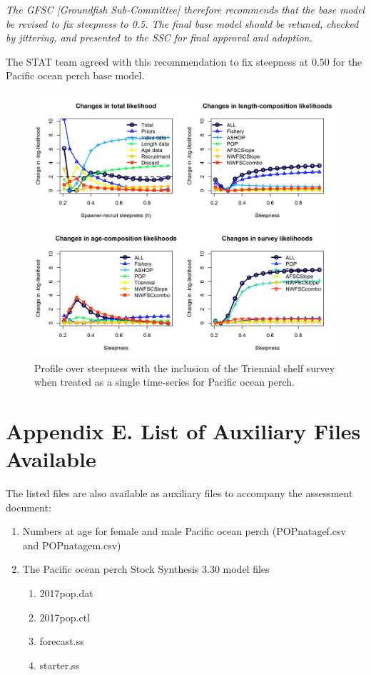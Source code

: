 \documentclass[12pt,]{article}
\begin{document}
\emph{The GFSC {[}Groundfish Sub-Committee{]} therefore recommends that
the base model be revised to fix steepness to 0.5. The final base model
should be retuned, checked by jittering, and presented to the SSC for
final approval and adoption.}

The STAT team agreed with this recommendation to fix steepness at 0.50
for the Pacific ocean perch base model.

\begin{figure}
\centering
\includegraphics{Figures/triennial_piner_panel_h.png}
\caption{Profile over steepness with the inclusion of the Triennial
shelf survey when treated as a single time-series for Pacific ocean
perch. \label{fig:Tri_Profile}}
\end{figure}

\FloatBarrier

\section{Appendix E. List of Auxiliary Files
Available}\label{appendix-e.-list-of-auxiliary-files-available}

The listed files are also available as auxiliary files to accompany the
assessment document:

\begin{enumerate}
  \item Numbers at age for female and male Pacific ocean perch (POPnatagef.csv and POPnatagem.csv)
  \item The Pacific ocean perch Stock Synthesis 3.30 model files
  
  \begin{enumerate}
    \item 2017pop.dat
    \item 2017pop.ctl
    \item forecast.ss
    \item starter.ss
  \end{enumerate}
\end{enumerate}
\end{document}

